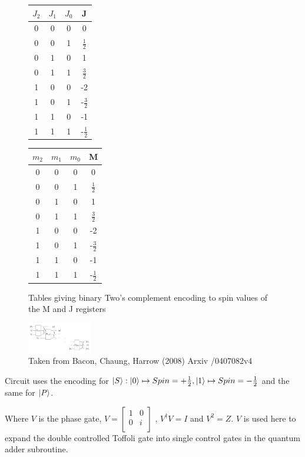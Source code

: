 \documentclass[landscape, 12pt]{article}
\begin{document}
\vspace{1cm}
%
\begin{figure}
\begin{tabular}{ |c c c|c| } 
\hline
 $J_2$ &$J_1$ &$J_0$ &J \\
 \hline
 0 &0 &0 &0 \\ 
 0 &0 &1 &$\frac{1}{2}$ \\ 
 0 &1 &0 &1 \\ 
 0 &1 &1 &$\frac{3}{2}$ \\ 
 \hline 
 1 &0 &0 &-2 \\ 
 1 &0 &1 &-$\frac{3}{2}$ \\ 
 1 &1 &0 &-1 \\ 
 1 &1 &1 &-$\frac{1}{2}$ \\  
 \hline 
\end{tabular}
\quad
\begin{tabular}{ |c c c|c| } 
\hline
 $m_2$ &$m_1$ &$m_0$ &M \\
 \hline
 0 &0 &0 &0 \\ 
 0 &0 &1 &$\frac{1}{2}$ \\ 
 0 &1 &0 &1 \\ 
 0 &1 &1 &$\frac{3}{2}$ \\ 
 \hline 
 1 &0 &0 &-2 \\ 
 1 &0 &1 &-$\frac{3}{2}$ \\ 
 1 &1 &0 &-1 \\ 
 1 &1 &1 &-$\frac{1}{2}$ \\  
 \hline
\end{tabular}
\caption{Tables giving binary Two's complement encoding to spin values of the M and J registers}
\label{fig:encoding}
\quad
\includegraphics[width=0.25\textwidth]{schurcascade.png}
\caption{Taken from Bacon, Chaung, Harrow (2008) Arxiv /0407082v4}
\vspace{-200pt} 
\end{figure}

Circuit uses the encoding for $\left\vert{S}\right\rangle : \left\vert{0}\right\rangle \mapsto Spin = +\frac{1}{2}, \left\vert{1}\right\rangle \mapsto Spin = -\frac{1}{2}$ and the same for $\left\vert{P}\right\rangle$. 

Where $V$ is the phase gate, 
$ V = \begin{bmatrix}
1 & 0 \\
0 & i \\
\end{bmatrix} $
, $V^{\dag}V = I$ and $V^2 = Z$. $V$ is used here to expand the double controlled Toffoli gate into single control gates in the quantum adder subroutine.
\end{document}
